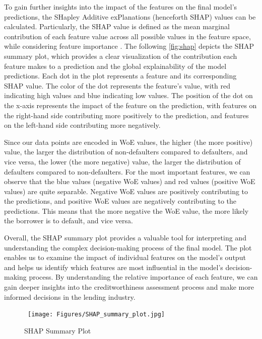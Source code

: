 To gain further insights into the impact of the features on the final model's predictions, the SHapley Additive exPlanations (henceforth SHAP) values can be calculated. Particularly, the SHAP value is defined as the mean marginal contribution of each feature value across all possible values in the feature space, while considering feature importance \citep{bhattacharya2022applied}.
The following \autoref{fig:shap} depicts the SHAP summary plot, which provides a clear visualization of the contribution each feature makes to a prediction and the global explainability of the model predictions.
Each dot in the plot represents a feature and its corresponding SHAP value.
The color of the dot represents the feature's value, with red indicating high values and blue indicating low values.
The position of the dot on the x-axis represents the impact of the feature on the prediction, with features on the right-hand side contributing more positively to the prediction, and features on the left-hand side contributing more negatively.

Since our data points are encoded in WoE values, the higher (the more positive) value, the larger the distribution of non-defaulters compared to defaulters, and vice versa, the lower (the more negative) value, the larger the distribution of defaulters compared to non-defaulters.
For the most important features, we can observe that the blue values (negative WoE values) and red values (positive WoE values) are quite separable.
Negative WoE values are positively contributing to the predictions, and positive WoE values are negatively contributing to the predictions. This means that the more negative the WoE value, the more likely the borrower is to default, and vice versa.

Overall, the SHAP summary plot provides a valuable tool for interpreting and understanding the complex decision-making process of the final model.
The plot enables us to examine the impact of individual features on the model's output and helps us identify which features are most influential in the model's decision-making process.
By understanding the relative importance of each feature, we can gain deeper insights into the creditworthiness assessment process and make more informed decisions in the lending industry.

\begin{figure}[H]
\centering
\caption{SHAP Summary Plot}\vspace{0.5em}
\label{fig:shap}\
\texttt{[image: Figures/SHAP\_summary\_plot.jpg]}

\vspace{-1em}
\end{figure}


